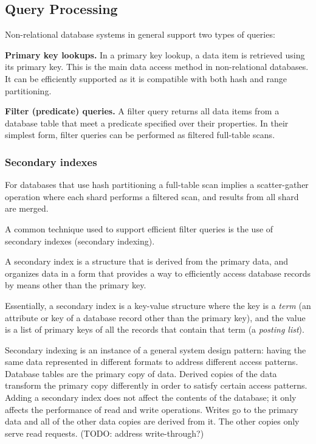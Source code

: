 \subsection{Query Processing}

Non-relational database systems in general support two types of queries:

\bigskip
\noindent
\textbf{Primary key lookups.}
In a primary key lookup, a data item is retrieved using its primary key.
This is the main data access method in non-relational databases.
It can be efficiently supported as it is compatible with both hash and range partitioning.

\bigskip
\noindent
\textbf{Filter (predicate) queries.}
A filter query returns all data items from a database table that meet a predicate specified over their properties.
In their simplest form, filter queries can be performed as filtered full-table scans.

\subsubsection{Secondary indexes}
For databases that use hash partitioning a full-table scan implies a scatter-gather operation where each shard
performs a filtered scan, and results from all shard are merged.

A common technique used to support efficient filter queries is the use of secondary indexes (secondary indexing).

A secondary index is a structure that is derived from the primary data, and organizes data in a form that
provides a way to efficiently access database records by means other than the primary key.

Essentially, a secondary index is a key-value structure where the key is a \textit{term} (an attribute or key of a
database record other than the primary key),
and the value is a list of primary keys of all the records that contain that term (a \textit{posting list}).

Secondary indexing is an instance of a general system design pattern:
having the same data represented in different formats to address different access patterns.
Database tables are the primary copy of data.
Derived copies of the data transform the primary copy differently in order to satisfy certain access patterns.
Adding a secondary index does not affect the contents of the database;
it only affects the performance of read and write operations.
Writes go to the primary data and all of the other data copies are derived from it.
The other copies only serve read requests.
(TODO: address write-through?)

